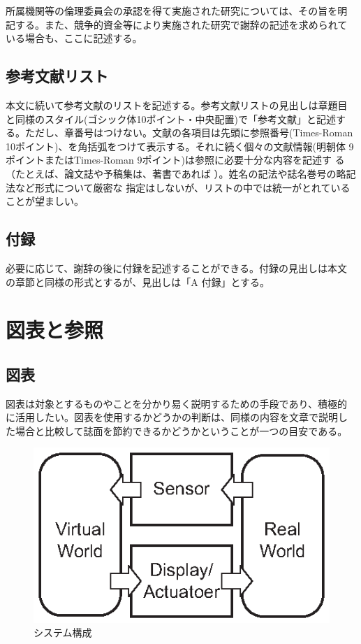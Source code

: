 \documentclass[a4paper,twoside]{jarticle}
\begin{document}
所属機関等の倫理委員会の承認を得て実施された研究については、その旨を明
記する。また、競争的資金等により実施された研究で謝辞の記述を求められて
いる場合も、ここに記述する。

\subsection{参考文献リスト}
本文に続いて参考文献のリストを記述する。参考文献リストの見出しは章題目
と同様のスタイル(ゴシック体10ポイント・中央配置)で「参考文献」と記述す
る。ただし、章番号はつけない。文献の各項目は先頭に参照番号(Times-Roman
10ポイント)、を角括弧をつけて表示する。それに続く個々の文献情報(明朝体
9ポイントまたはTimes-Roman 9ポイント)は参照に必要十分な内容を記述す
る（たとえば、論文誌や予稿集は\cite{bib1,bib2,bib3,bib4}、著書であれば
\cite{bib5,bib6}）。姓名の記法や誌名巻号の略記法など形式について厳密な
指定はしないが、リストの中では統一がとれていることが望ましい。

\subsection{付録}
必要に応じて、謝辞の後に付録を記述することができる。付録の見出しは本文
の章節と同様の形式とするが、見出しは「A 付録」とする。

\section{図表と参照}

\subsection{図表}
図表は対象とするものやことを分かり易く説明するための手段であり、積極的
に活用したい。図表を使用するかどうかの判断は、同様の内容を文章で説明し
た場合と比較して誌面を節約できるかどうかということが一つの目安である。

\newpage

\begin{figure}[ht]
\begin{center}
\includegraphics[scale=1.0]{zu.eps}
\end{center}
\caption{システム構成}
\label{fig:zu}
\end{figure}
\end{document}
